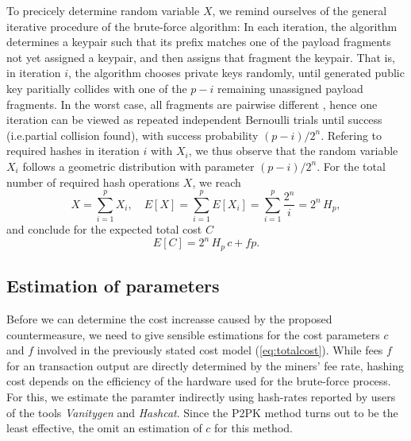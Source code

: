 \documentclass[10pt,a4paper,twocolumn]{article}
\begin{document}
To precicely determine random variable $X$, we remind ourselves of the general iterative procedure of the brute-force algorithm:
In each iteration, the algorithm determines a keypair such that its prefix matches one of the payload fragments not yet assigned a keypair, and then assigns that fragment the keypair.
That is, in iteration $i$, the algorithm chooses private keys randomly, until generated public key paritially collides with one of the $p-i$ remaining unassigned payload fragments.
In the worst case, all fragments are pairwise different%
, hence one iteration can be viewed as repeated independent Bernoulli trials until success (i.e.\@ partial collision found), with success probability $(p-i)/2^n$.  
Refering to required hashes in iteration $i$ with $X_i$, we thus observe that the random variable $X_i$ follows a geometric distribution with parameter $(p-i)/2^n$.
For the total number of required hash operations $X$, we reach
\[ X = \sum_{i=1}^{p} X_i, \quad E[X] = \sum_{i=1}^{p} E[X_i] = \sum_{i=1}^{p}\frac{2^n}{i} = 2^n\, H_p, \]
and conclude for the expected total cost $C$
\begin{equation}
    E[C] = 2^n\, H_p\,c + fp.\label{eq:totalcost}
\end{equation}


\subsection{Estimation of parameters}



Before we can determine the cost increasse caused by the proposed countermeasure, we need to give sensible estimations for the cost parameters $c$ and $f$ involved in the previously stated cost model (\ref{eq:totalcost}).
While fees $f$ for an transaction output are directly determined by the miners' fee rate, hashing cost depends on the efficiency of the hardware used for the brute-force process.
For this, we estimate the paramter indirectly using hash-rates reported by users of the tools \emph{Vanitygen} and \emph{Hashcat}.
Since the P2PK method turns out to be the least effective, the omit an estimation of $c$ for this method.
\end{document}
